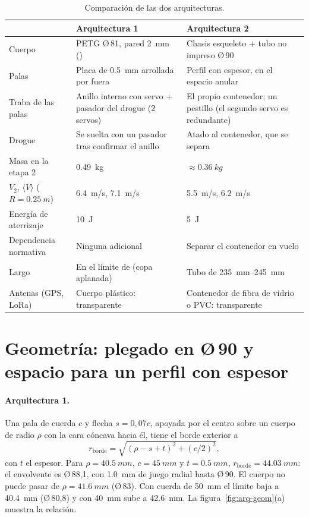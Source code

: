 \begin{table}[H]
\centering\small
\caption{Comparación de las dos arquitecturas.}\label{tab:arq-comparacion}
\begin{tabularx}{\textwidth}{@{}lYY@{}}
\toprule
 & \textbf{Arquitectura 1} & \textbf{Arquitectura 2}\\\midrule
Cuerpo & PETG Ø\,81, pared \SI{2}{mm} () & Chasis esqueleto + tubo no impreso Ø\,90\\
Palas & Placa de \SI{0.5}{mm} arrollada por fuera & Perfil con espesor, en el espacio anular\\
Traba de las palas & Anillo interno con servo + pasador del drogue (2 servos) & El propio contenedor; un pestillo (el segundo servo es redundante)\\
Drogue & Se suelta con un pasador tras confirmar el anillo & Atado al contenedor, que se separa\\
Masa en la etapa 2 & \SI{0.49}{kg} & $\approx\SI{0.36}{kg}$\\
$V_2$, $\langle V\rangle$ ($R=\SI{0.25}{m}$) & \SI{6.4}{m/s}, \SI{7.1}{m/s} & \SI{5.5}{m/s}, \SI{6.2}{m/s}\\
Energía de aterrizaje & \SI{10}{J} & \SI{5}{J}\\
Dependencia normativa & Ninguna adicional & Separar el contenedor en vuelo\\
Largo & En el límite de  (copa aplanada) & Tubo de \SIrange{235}{245}{mm}\\
Antenas (GPS, LoRa) & Cuerpo plástico: transparente & Contenedor de fibra de vidrio o PVC: transparente\\
\bottomrule
\end{tabularx}
\end{table}

\section{Geometría: plegado en Ø\,90 y espacio para un perfil con espesor}\label{sec:arq-geom}

\paragraph{Arquitectura 1.} Una pala de cuerda $c$ y flecha $s=0{,}07c$, apoyada por el centro
sobre un cuerpo de radio $\rho$ con la cara cóncava hacia él, tiene el borde exterior a
\begin{equation}
  r_\text{borde}=\sqrt{(\rho-s+t)^2+(c/2)^2},
  \label{eq:arq-rborde}
\end{equation}
con $t$ el espesor. Para $\rho=\SI{40.5}{mm}$, $c=\SI{45}{mm}$ y $t=\SI{0.5}{mm}$,
$r_\text{borde}=\SI{44.03}{mm}$: el envolvente es Ø\,88,1, con \SI{1.0}{mm} de juego
radial hasta Ø\,90. El cuerpo no puede pasar de $\rho=\SI{41.6}{mm}$ (Ø\,83). Con cuerda
de \SI{50}{mm} el límite baja a \SI{40.4}{mm} (Ø\,80,8) y con \SI{40}{mm} sube a
\SI{42.6}{mm}. La figura~\ref{fig:arq-geom}(a) muestra la relación.

